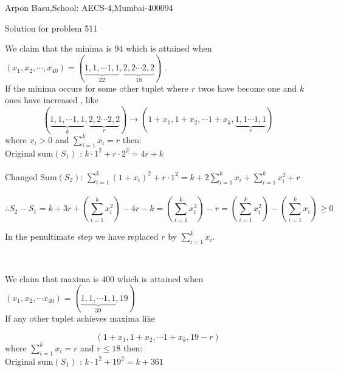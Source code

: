 \documentclass[a4paper,10pt]{article}
\begin{document}
\begin{center}


Arpon Basu,School: AECS-4,Mumbai-400094

Solution for problem 511
\end{center}

   We claim that the minima is $94$ which is attained when $(x_{1},x_{2}, \cdots ,x_{40})=(\underbrace{1,1, \cdots 1,1}_{22},\underbrace{2,2 \cdots 2,2}_{18})$ .\\
   If the minima occurs for some other tuplet where $r$ twos have become one and $k$ ones have increased , like 
   $$ (\underbrace{1,1, \cdots 1,1}_{k},\underbrace{2,2 \cdots 2,2}_{r}) \longrightarrow (1+x_{1},1+x_{2}, \cdots 1+x_{k},\underbrace{1,1 \cdots 1,1}_{r})$$ 
   where $x_{i}>0$ and $\sum_{i=1}^{k} x_{i} = r $ then: \\
   Original sum$(S_{1})$ : $k\cdot 1^2 + r\cdot 2^2 = 4r+k$ \\
   \\
   Changed Sum$(S_{2})$: $\sum_{i=1}^{k} (1+x_{i})^2 + r\cdot 1^2=k+2 \sum_{i=1}^{k} x_{i} +\sum_{i=1}^{k} x_{i}^2 + r$\\
   \\
   
   
   
   \begin{dmath}
\therefore S_{2}-S_{1} =k+3r+ (\sum_{i=1}^{k} x_{i}^2) -4r - k 
          = (\sum_{i=1}^{k} x_{i}^2) -r
          =(\sum_{i=1}^{k} x_{i}^2) - (\sum_{i=1}^{k} x_{i}) 
          \ge 0
\end{dmath}
   
In the penultimate step we have replaced $r$ by $\sum_{i=1}^{k} x_{i}$.
   
   
   
   \begin{center}
      \\
    \end{center}
   
   We claim that maxima is $400$ which is attained when $(x_{1},x_{2}, \cdots x_{40})=(\underbrace{1,1, \cdots 1,1}_{39},19)$ \\
   If any other tuplet achieves maxima like
   
    $$ (1+x_{1},1+x_{2}, \cdots 1+x_{k},19-r)$$ where $\sum_{i=1}^{k} x_{i} = r $ and $r \le 18$ then: \\
    
    Original sum$(S_{1})$ : $k\cdot 1^2 + 19^2 = k+361$ \\
    
\end{document}
